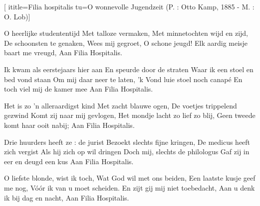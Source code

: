  [
ititle={Filia hospitalis}
tu={O wonnevolle Jugendzeit (P. : Otto Kamp, 1885 - M. : O. Lob)}]

\beginverse
O heerlijke studententijd
Met talloze vermaken,
Met minnetochten wijd en zijd,
De schoonsten te genaken,
Wees mij gegroet, O schone jeugd!
Elk aardig meisje baart me vreugd,
{Aan Filia Hospitalis.}
\endverse

\beginverse
Ik kwam als eerstejaars hier aan
En speurde door de straten
Waar ik een stoel en bed vond staan
Om mij daar neer te laten,
'k Vond luie stoel noch canapé
En toch viel mij de kamer mee
{Aan Filia Hospitalis.}
\endverse

\beginverse
Het is zo 'n alleraardigst kind
Met zacht blauwe ogen,
De voetjes trippelend gezwind
Komt zij naar mij gevlogen,
Het mondje lacht zo lief zo blij,
Geen tweede komt haar ooit nabij;
{Aan Filia Hospitalis.}
\endverse

\beginverse
Drie huurders heeft ze : de jurist
Bezoekt slechts fijne kringen,
De medicus heeft zich vergist
Als hij zich op wil dringen
Doch mij, slechts de philologus
Gaf zij in eer en deugd een kus
{Aan Filia Hospitalis.}
\endverse

\beginverse
O liefste blonde, wist ik toch,
Wat God wil met ons beiden,
Een laatste kusje geef me nog,
Vóór ik van u moet scheiden.
En zijt gij mij niet toebedacht,
Aan u denk ik bij dag en nacht,
{Aan Filia Hospitalis.}
\endverse
\endsong